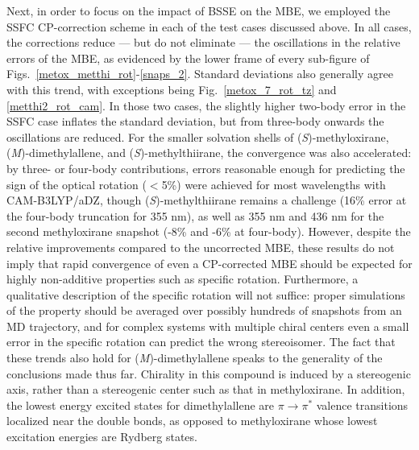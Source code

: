         Next, in order to focus on the impact of BSSE on the MBE, we employed the SSFC CP-correction scheme in each of the test cases discussed above.  In all cases, the corrections reduce --- but do not eliminate --- the oscillations in the relative errors of the MBE, as evidenced by the lower frame of every sub-figure of Figs.~\ref{metox_metthi_rot}-\ref{snaps_2}.  Standard deviations also generally agree with this trend, with exceptions being Fig.~\ref{metox_7_rot_tz} and \ref{metthi2_rot_cam}.  In those two cases, the slightly higher two-body error in the SSFC case inflates the standard deviation, but from three-body onwards the oscillations are reduced.  For the smaller solvation shells of (\textit{S})-methyloxirane, (\textit{M})-dimethylallene, and (\textit{S})-methylthiirane, the convergence was also accelerated: by three- or four-body contributions, errors reasonable enough for predicting the sign of the optical rotation ($<$5\%) were achieved for most wavelengths with CAM-B3LYP/aDZ, though (\textit{S})-methylthiirane remains a challenge (16\% error at the four-body truncation for 355 nm), as well as 355 nm and 436 nm for the second methyloxirane snapshot (-8\% and -6\% at four-body). However, despite the relative improvements compared to the uncorrected MBE, these results do not imply that rapid convergence of even a CP-corrected MBE should be expected for highly non-additive properties such as specific rotation. Furthermore, a qualitative description of the specific rotation will not suffice: proper simulations of the property should be averaged over possibly hundreds of snapshots from an MD trajectory, and for complex systems with multiple chiral centers even a small error in the specific rotation can predict the wrong stereoisomer\cite{Fuentes18}. The fact that these trends also hold for (\textit{M})-dimethylallene speaks to the generality of the conclusions made thus far. Chirality in this compound is induced by a stereogenic axis, rather than a stereogenic center such as that in methyloxirane. In addition, the lowest energy excited states for dimethylallene are $\pi\rightarrow \pi^*$ valence transitions localized near the double bonds, as opposed to methyloxirane whose lowest excitation energies are Rydberg states\cite{Tam2004}. 
        
